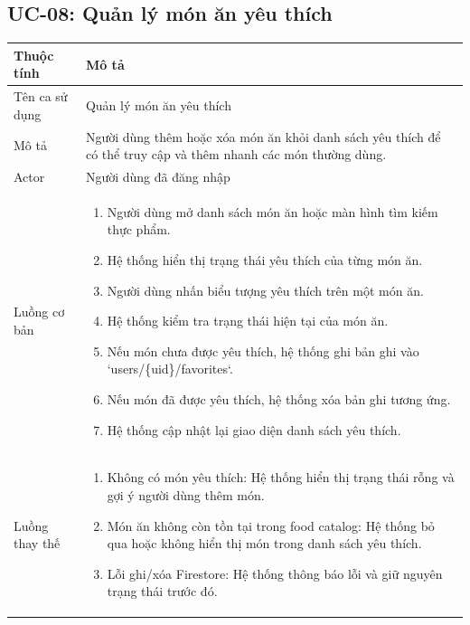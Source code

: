 \subsection{UC-08: Quản lý món ăn yêu thích}

\begin{longtable}{|p{4cm}|p{11cm}|}
    \hline
    \textbf{Thuộc tính} & \textbf{Mô tả} \\
    \hline
    \endhead
    \hline
    \endfoot
    Tên ca sử dụng & Quản lý món ăn yêu thích \\
    \hline
    Mô tả & Người dùng thêm hoặc xóa món ăn khỏi danh sách yêu thích để có thể truy cập và thêm nhanh các món thường dùng. \\
    \hline
    Actor & Người dùng đã đăng nhập \\
    \hline
    Luồng cơ bản &
        \begin{enumerate}[nosep]
            \item Người dùng mở danh sách món ăn hoặc màn hình tìm kiếm thực phẩm.
            \item Hệ thống hiển thị trạng thái yêu thích của từng món ăn.
            \item Người dùng nhấn biểu tượng yêu thích trên một món ăn.
            \item Hệ thống kiểm tra trạng thái hiện tại của món ăn.
            \item Nếu món chưa được yêu thích, hệ thống ghi bản ghi vào `users/\{uid\}/favorites`.
            \item Nếu món đã được yêu thích, hệ thống xóa bản ghi tương ứng.
            \item Hệ thống cập nhật lại giao diện danh sách yêu thích.
        \end{enumerate} \\
    \hline
    Luồng thay thế &
        \begin{enumerate}[nosep]
            \item[2a.] Không có món yêu thích: Hệ thống hiển thị trạng thái rỗng và gợi ý người dùng thêm món.
            \item[5a.] Món ăn không còn tồn tại trong food catalog: Hệ thống bỏ qua hoặc không hiển thị món trong danh sách yêu thích.
            \item[6a.] Lỗi ghi/xóa Firestore: Hệ thống thông báo lỗi và giữ nguyên trạng thái trước đó.
        \end{enumerate} \\

\end{longtable}
